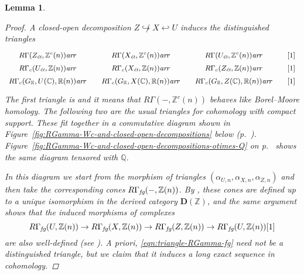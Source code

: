 \documentclass[10pt,a4paper,oneside,draft]{article}
\newcommand{\CC}{\mathbb{C}}
\newcommand{\QQ}{\mathbb{Q}}
\newcommand{\RR}{\mathbb{R}}
\newcommand{\ZZ}{\mathbb{Z}}
\newcommand{\ar}{\text{\it ar}}
\newcommand{\et}{\text{\it \'{e}t}}
\newcommand{\fg}{\text{\it fg}}
\theoremstyle{myplain}
\newtheorem{lemma}[theorem]{Lemma}
\theoremstyle{mydefinition}
\numberwithin{equation}{section}
\begin{document}
\begin{lemma}
  \begin{proof}
    A closed-open decomposition $Z \not\hookrightarrow X \hookleftarrow U$
    induces the distinguished triangles
    \[ \begin{tikzcd}[row sep=0pt,column sep=1em,font=\small]
        R\Gamma (Z_\et, \ZZ^c (n)) \ar{r} & R\Gamma (X_\et, \ZZ^c (n)) \ar{r} & R\Gamma (U_\et, \ZZ^c (n)) \ar{r} & {[1]} \\
        R\Gamma_c (U_\et, \ZZ (n)) \ar{r} & R\Gamma_c (X_\et, \ZZ (n)) \ar{r} & R\Gamma_c (Z_\et, \ZZ (n)) \ar{r} & {[1]} \\
        R\Gamma_c (G_\RR, U (\CC), \RR (n)) \ar{r} & R\Gamma_c (G_\RR, X (\CC), \RR (n)) \ar{r} & R\Gamma_c (G_\RR, Z (\CC), \RR (n)) \ar{r} & {[1]}
      \end{tikzcd} \]
    The first triangle is \cite[Corollary~7.2]{Geisser-2010} and it means that
    $R\Gamma (-, \ZZ^c (n))$ behaves like Borel--Moore homology. The following
    two are the usual triangles for cohomology with compact support. These fit
    together in a commutative diagram shown in
    Figure~\ref{fig:RGamma-Wc-and-closed-open-decompositions} below
    (p.~\pageref{fig:RGamma-Wc-and-closed-open-decompositions}). Figure~\ref{fig:RGamma-Wc-and-closed-open-decompositions-otimes-Q}
    on p.~\pageref{fig:RGamma-Wc-and-closed-open-decompositions-otimes-Q} shows
    the same diagram tensored with $\QQ$.

    In this diagram we start from the morphism of triangles
    $(\alpha_{U,n}, \alpha_{X,n}, \alpha_{Z,n})$ and then take the corresponding
    cones $R\Gamma_\fg (-, \ZZ(n))$. By
    \cite[Proposition~5.6]{Beshenov-Weil-etale-1}, these cones are defined up to
    a \emph{unique} isomorphism in the derived category $\mathbf{D} (\ZZ)$, and
    the same argument shows that the induced morphisms of complexes
    \begin{equation}
      \label{eqn:triangle-RGamma-fg}
      R\Gamma_\fg (U, \ZZ(n)) \to
      R\Gamma_\fg (X, \ZZ(n)) \to
      R\Gamma_\fg (Z, \ZZ(n)) \to
      R\Gamma_\fg (U, \ZZ(n)) [1]
    \end{equation}
    are also well-defined
    (see \cite[Corollary~A.3]{Beshenov-Weil-etale-1}). A priori,
    \eqref{eqn:triangle-RGamma-fg} need not be a distinguished triangle, but we
    claim that it induces a long exact sequence in cohomology.


\end{proof}
\end{lemma}
\end{document}
